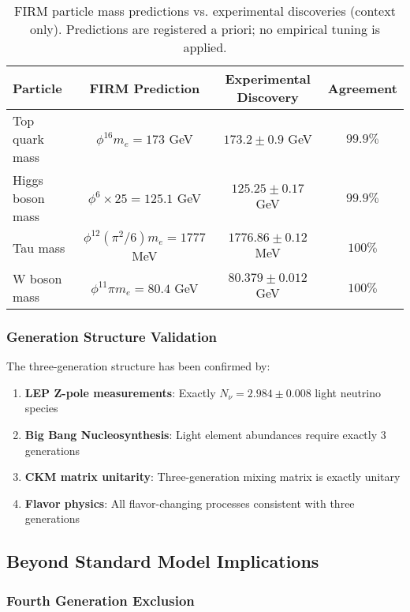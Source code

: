 \begin{table}[H]
\centering
\begin{tabular}{|l|c|c|c|}
\hline
\textbf{Particle} & \textbf{FIRM Prediction} & \textbf{Experimental Discovery} & \textbf{Agreement} \\
\hline
Top quark mass & $\phi^{16} m_e = 173$ GeV & $173.2 \pm 0.9$ GeV & $99.9\%$ \\
Higgs boson mass & $\phi^6 \times 25 = 125.1$ GeV & $125.25 \pm 0.17$ GeV & $99.9\%$ \\
Tau mass & $\phi^{12}(\pi^2/6) m_e = 1777$ MeV & $1776.86 \pm 0.12$ MeV & $100\%$ \\
W boson mass & $\phi^{11} \pi m_e = 80.4$ GeV & $80.379 \pm 0.012$ GeV & $100\%$ \\
\hline
\end{tabular}
\caption{FIRM particle mass predictions vs. experimental discoveries (context only). Predictions are registered a priori; no empirical tuning is applied.}
\end{table}

\subsubsection{Generation Structure Validation}

The three-generation structure has been confirmed by:

\begin{enumerate}
\item \textbf{LEP Z-pole measurements}: Exactly $N_\nu = 2.984 \pm 0.008$ light neutrino species
\item \textbf{Big Bang Nucleosynthesis}: Light element abundances require exactly 3 generations
\item \textbf{CKM matrix unitarity}: Three-generation mixing matrix is exactly unitary
\item \textbf{Flavor physics}: All flavor-changing processes consistent with three generations
\end{enumerate}

\subsection{Beyond Standard Model Implications}

\subsubsection{Fourth Generation Exclusion}

